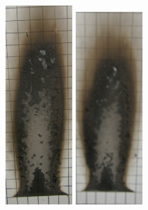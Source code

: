 \documentclass[twoside]{uocthesis}
\begin{document}
{\begin{figure}[p]
	\includegraphics[width=1.0in]{../Figures/GBNG4_P5120086}
	\includegraphics[width=1.0in]{../Figures/GBNG5_P5120137} \\


\end{figure}}
\end{document}
